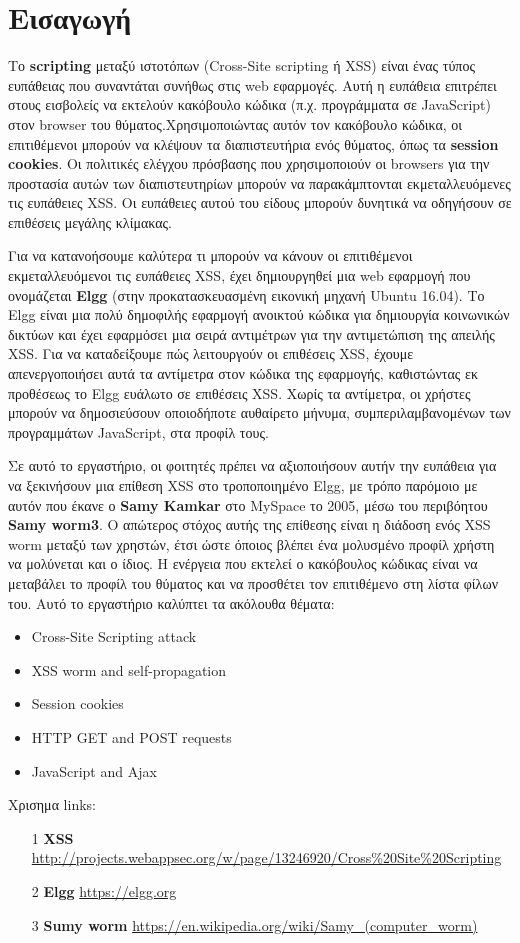 %
%
\section*{Εισαγωγή}
\noindent
Το \textbf{scripting} μεταξύ ιστοτόπων (Cross-Site scripting ή XSS) είναι
ένας τύπος ευπάθειας που συναντάται συνήθως στις web εφαρμογές. Αυτή η ευπάθεια
επιτρέπει στους εισβολείς να εκτελούν κακόβουλο κώδικα (π.χ. προγράμματα σε
JavaScript) στον browser του θύματος.Χρησιμοποιώντας αυτόν τον κακόβουλο
κώδικα, οι επιτιθέμενοι μπορούν να κλέψουν τα διαπιστευτήρια ενός θύματος, 
όπως τα \textbf{session cookies}. Οι πολιτικές ελέγχου πρόσβασης που χρησιμοποιούν οι
browsers για την προστασία αυτών των διαπιστευτηρίων μπορούν να παρακάμπτονται
εκμεταλλευόμενες τις ευπάθειες XSS. Οι ευπάθειες αυτού του είδους μπορούν
δυνητικά να οδηγήσουν σε επιθέσεις μεγάλης κλίμακας.

\noindent
Για να κατανοήσουμε καλύτερα τι μπορούν να κάνουν οι επιτιθέμενοι εκμεταλλευόμενοι τις
ευπάθειες XSS, έχει δημιουργηθεί μια web εφαρμογή που ονομάζεται \textbf{Elgg} (στην
προκατασκευασμένη εικονική μηχανή Ubuntu 16.04). Το Elgg είναι μια πολύ δημοφιλής
εφαρμογή ανοικτού κώδικα για δημιουργία κοινωνικών δικτύων και έχει εφαρμόσει μια
σειρά αντιμέτρων για την αντιμετώπιση της απειλής XSS. Για να καταδείξουμε πώς
λειτουργούν οι επιθέσεις XSS, έχουμε απενεργοποιήσει αυτά τα αντίμετρα στον κώδικα της
εφαρμογής, καθιστώντας εκ προθέσεως το Elgg ευάλωτο σε επιθέσεις XSS. Χωρίς τα
αντίμετρα, οι χρήστες μπορούν να δημοσιεύσουν οποιοδήποτε αυθαίρετο μήνυμα,
συμπεριλαμβανομένων των προγραμμάτων JavaScript, στα προφίλ τους.

\noindent
Σε αυτό το εργαστήριο, οι φοιτητές πρέπει να αξιοποιήσουν αυτήν την ευπάθεια για να
ξεκινήσουν μια επίθεση XSS στο τροποποιημένο Elgg, με τρόπο παρόμοιο με αυτόν που
έκανε ο \textbf{Samy Kamkar} στο MySpace το 2005, μέσω του περιβόητου \textbf{Samy worm3}. Ο
απώτερος στόχος αυτής της επίθεσης είναι η διάδοση ενός XSS worm μεταξύ των χρηστών,
έτσι ώστε όποιος βλέπει ένα μολυσμένο προφίλ χρήστη να μολύνεται και ο ίδιος. Η ενέργεια
που εκτελεί ο κακόβουλος κώδικας είναι να μεταβάλει το προφίλ του θύματος και να
προσθέτει τον επιτιθέμενο στη λίστα φίλων του. Αυτό το εργαστήριο καλύπτει τα ακόλουθα
θέματα:
\begin{itemize}
	\item Cross-Site Scripting attack
	\item XSS worm and self-propagation
	\item Session cookies
	\item HTTP GET and POST requests
	\item JavaScript and Ajax
\end{itemize}
Χρισημα links:
\begin{itemize}
	\item[1] \textbf{XSS} \url{http://projects.webappsec.org/w/page/13246920/Cross%20Site%20Scripting}
	\item[2] \textbf{Elgg} \url{https://elgg.org}
	\item[3] \textbf{Sumy worm} \url{https://en.wikipedia.org/wiki/Samy_(computer_worm)}
\end{itemize}
